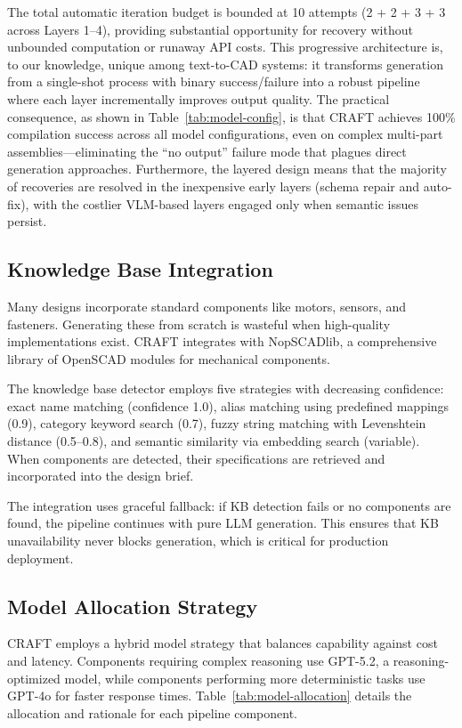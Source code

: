 \documentclass[5p,twocolumn,10pt,times]{elsarticle}
\begin{document}
The total automatic iteration budget is bounded at 10 attempts (2 + 2 + 3 + 3 across Layers 1--4), providing substantial opportunity for recovery without unbounded computation or runaway API costs. This progressive architecture is, to our knowledge, unique among text-to-CAD systems: it transforms generation from a single-shot process with binary success/failure into a robust pipeline where each layer incrementally improves output quality. The practical consequence, as shown in Table~\ref{tab:model-config}, is that CRAFT achieves 100\% compilation success across all model configurations, even on complex multi-part assemblies---eliminating the ``no output'' failure mode that plagues direct generation approaches. Furthermore, the layered design means that the majority of recoveries are resolved in the inexpensive early layers (schema repair and auto-fix), with the costlier VLM-based layers engaged only when semantic issues persist.


\subsection{Knowledge Base Integration}

Many designs incorporate standard components like motors, sensors, and fasteners. Generating these from scratch is wasteful when high-quality implementations exist. CRAFT integrates with NopSCADlib, a comprehensive library of OpenSCAD modules for mechanical components.

The knowledge base detector employs five strategies with decreasing confidence: exact name matching (confidence 1.0), alias matching using predefined mappings (0.9), category keyword search (0.7), fuzzy string matching with Levenshtein distance (0.5--0.8), and semantic similarity via embedding search (variable). When components are detected, their specifications are retrieved and incorporated into the design brief.

The integration uses graceful fallback: if KB detection fails or no components are found, the pipeline continues with pure LLM generation. This ensures that KB unavailability never blocks generation, which is critical for production deployment.

\subsection{Model Allocation Strategy}

CRAFT employs a hybrid model strategy that balances capability against cost and latency. Components requiring complex reasoning use GPT-5.2, a reasoning-optimized model, while components performing more deterministic tasks use GPT-4o for faster response times. Table~\ref{tab:model-allocation} details the allocation and rationale for each pipeline component.
\end{document}
